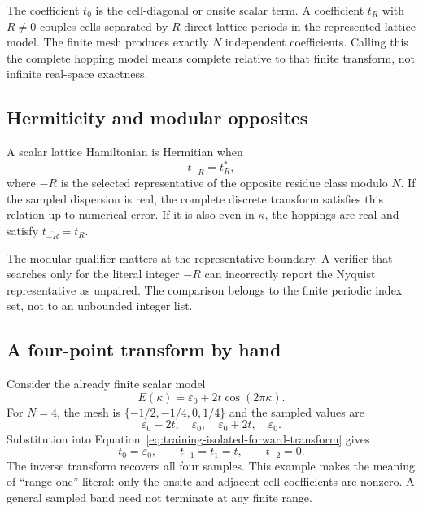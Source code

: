 The coefficient $t_0$ is the cell-diagonal or onsite scalar term. A coefficient
$t_R$ with $R\neq0$ couples cells separated by $R$ direct-lattice periods in
the represented lattice model. The finite mesh produces exactly $N$
independent coefficients. Calling this the complete hopping model means
complete relative to that finite transform, not infinite real-space exactness.

\subsection{Hermiticity and modular opposites}

A scalar lattice Hamiltonian is Hermitian when
\begin{equation}
  t_{\overline{-R}}=t_R^*,
  \label{eq:training-isolated-hopping-hermiticity}
\end{equation}
where $\overline{-R}$ is the selected representative of the opposite residue
class modulo $N$. If the sampled dispersion is real, the complete discrete
transform satisfies this relation up to numerical error. If it is also even in
$\kappa$, the hoppings are real and satisfy
$t_{\overline{-R}}=t_R$.

The modular qualifier matters at the representative boundary. A verifier that
searches only for the literal integer $-R$ can incorrectly report the Nyquist
representative as unpaired. The comparison belongs to the finite periodic
index set, not to an unbounded integer list.

\subsection{A four-point transform by hand}

Consider the already finite scalar model
\begin{equation}
  E(\kappa)=\varepsilon_0+2t\cos(2\pi\kappa).
  \label{eq:training-isolated-hand-band}
\end{equation}
For $N=4$, the mesh is
$\{-1/2,-1/4,0,1/4\}$ and the sampled values are
\begin{equation}
  \varepsilon_0-2t,
  \quad\varepsilon_0,
  \quad\varepsilon_0+2t,
  \quad\varepsilon_0.
\end{equation}
Substitution into Equation~\eqref{eq:training-isolated-forward-transform}
gives
\begin{equation}
  t_0=\varepsilon_0,
  \qquad
  t_{-1}=t_1=t,
  \qquad
  t_{-2}=0.
\end{equation}
The inverse transform recovers all four samples. This example makes the meaning
of ``range one'' literal: only the onsite and adjacent-cell coefficients are
nonzero. A general sampled band need not terminate at any finite range.

